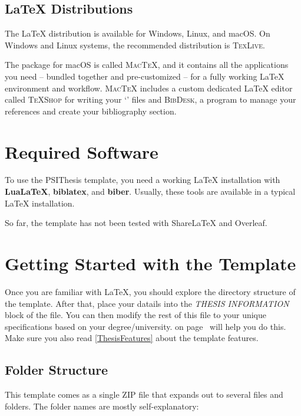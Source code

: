 \subsection{LaTeX Distributions}

The LaTeX distribution is available for Windows, Linux, and macOS\@.
On Windows and Linux systems, the recommended distribution is \textsc{TexLive}.

The package for macOS is called \textsc{MacTeX}, and it contains all the applications you need -- bundled together and pre-customized -- for a fully working LaTeX environment and workflow. \textsc{MacTeX} includes a custom dedicated LaTeX editor called \textsc{TeXShop} for writing your `' files and \textsc{BibDesk}, a program to manage your references and create your bibliography section.



\section{Required Software}

To use the PSIThesis template, you need a working LaTeX installation with \textbf{LuaLaTeX}, \textbf{biblatex}, and \textbf{biber}. Usually, these tools are available in a typical LaTeX installation.

So far, the template has not been tested with ShareLaTeX and Overleaf.


\section{Getting Started with the Template}

Once you are familiar with LaTeX, you should explore the directory structure of the template. After that, place your datails into the \emph{THESIS INFORMATION} block of the  file. You can then modify the rest of this file to your unique specifications based on your degree/university.  on page~\pageref{FillingFile} will help you do this. Make sure you also read \cref{ThesisFeatures} about the template features.


\subsection{Folder Structure}

This template comes as a single ZIP file that expands out to several files and folders. The folder names are mostly self-explanatory:

